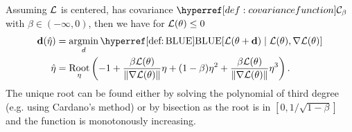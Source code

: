 
\begin{theorem}[Stationary]
	Assuming \(\mathcal{L}\) is centered, has covariance \(\C_\beta\) with
	\(\beta\in(-\infty, 0)\), then we have for \(\mathcal{L}(\theta)\le 0\)
	\begin{align*}
		\step(\hat{\lr})
		&= \argmin_{d}
		\BLUE[\Loss(\param + \step) \mid \Loss(\param), \grad\Loss(\param)]\\
		\hat{\lr}
		&= \Root_\lr\left(
			-1 + \frac{\beta\Loss(\param)}{\|\grad\Loss(\param)\|}\lr
			+(1-\beta)\lr^2 + \frac{\beta\Loss(\param)}{\|\grad\Loss(\param)\|}\lr^3
		\right).
	\end{align*}
	The unique root can be found either by solving the polynomial of third degree
	(e.g. using Cardano's method) or by bisection as the root is in \([0,
	1/\sqrt{1-\beta}]\) and the function is monotonously increasing.
\end{theorem}
